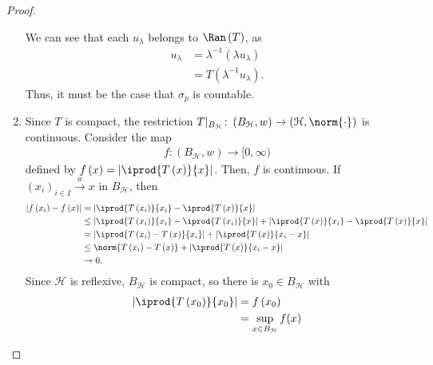 \documentclass[10pt]{mypackage}
\begin{document}
\begin{proof}
\begin{enumerate}[(1)]
      We can see that each $u_{\lambda}$ belongs to $\Ran\left(T\right)$, as
      \begin{align*}
        u_{\lambda} &= \lambda^{-1}\left(\lambda u_{\lambda}\right)\\
                    &= T\left(\lambda^{-1}u_{\lambda}\right).
      \end{align*}
      Thus, it must be the case that $\sigma_p$ is countable.
    \item Since $T$ is compact, the restriction $T|_{B_{\mathcal{H}}}\colon \left(B_{\mathcal{H}},w\right)\rightarrow \left(\mathcal{H},\norm{\cdot}\right)$ is continuous. Consider the map
      \begin{align*}
        f\colon \left(B_{\mathcal{H}},w\right)\rightarrow [0,\infty)
      \end{align*}
      defined by $f\left(x\right) = \left\vert \iprod{T\left(x\right)}{x} \right\vert$. Then, $f$ is continuous. If $\left(x_{i}\right)_{i\in I}\xrightarrow{w} x$ in $B_{\mathcal{H}}$, then
      \begin{align*}
        \left\vert f\left(x_i\right)-f\left(x\right) \right\vert &= \left\vert \iprod{T\left(x_i\right)}{x_i} - \iprod{T\left(x\right)}{x} \right\vert\\
                                                                 &\leq \left\vert \iprod{T\left(x_i\right)}{x_i} - \iprod{T\left(x_i\right)}{x} \right\vert + \left\vert \iprod{T\left(x\right)}{x_i} - \iprod{T\left(x\right)}{x} \right\vert\\
                                                                 &= \left\vert \iprod{T\left(x_i\right) - T\left(x\right)}{x_i} \right\vert + \left\vert \iprod{T\left(x\right)}{x_i - x} \right\vert\\
                                                                 &\leq \norm{T\left(x_i\right) - T\left(x\right)} + \left\vert \iprod{T\left(x\right)}{x_i - x} \right\vert\\
                                                                 &\rightarrow 0.
      \end{align*}
      Since $\mathcal{H}$ is reflexive, $B_{\mathcal{H}}$ is compact, so there is $x_0\in B_{\mathcal{H}}$ with
      \begin{align*}
        \left\vert \iprod{T\left(x_0\right)}{x_0} \right\vert &= f\left(x_0\right)\\
                                                              &= \sup_{x\in B_{\mathcal{H}}} f(x)\\

\end{align*}
\end{enumerate}
\end{proof}
\end{document}
